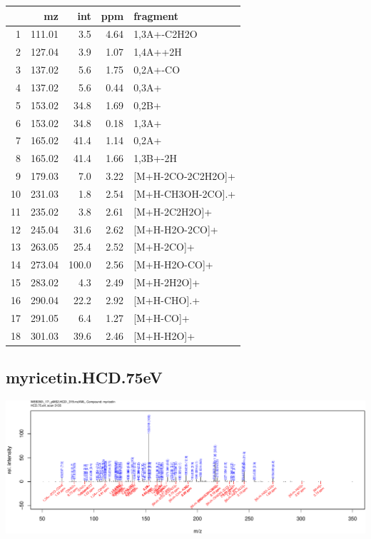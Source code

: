 \documentclass[]{article}
\begin{document}
\begin{table}[ht]
\centering
\begin{tabular}{rrrrl}
  \toprule
 & mz & int & ppm & fragment \\ 
  \midrule
1 & 111.01 & 3.5 & 4.64 & 1,3A+-C2H2O \\ 
  2 & 127.04 & 3.9 & 1.07 & 1,4A++2H \\ 
  3 & 137.02 & 5.6 & 1.75 & 0,2A+-CO \\ 
  4 & 137.02 & 5.6 & 0.44 & 0,3A+ \\ 
  5 & 153.02 & 34.8 & 1.69 & 0,2B+ \\ 
  6 & 153.02 & 34.8 & 0.18 & 1,3A+ \\ 
  7 & 165.02 & 41.4 & 1.14 & 0,2A+ \\ 
  8 & 165.02 & 41.4 & 1.66 & 1,3B+-2H \\ 
  9 & 179.03 & 7.0 & 3.22 & [M+H-2CO-2C2H2O]+ \\ 
  10 & 231.03 & 1.8 & 2.54 & [M+H-CH3OH-2CO].+ \\ 
  11 & 235.02 & 3.8 & 2.61 & [M+H-2C2H2O]+ \\ 
  12 & 245.04 & 31.6 & 2.62 & [M+H-H2O-2CO]+ \\ 
  13 & 263.05 & 25.4 & 2.52 & [M+H-2CO]+ \\ 
  14 & 273.04 & 100.0 & 2.56 & [M+H-H2O-CO]+ \\ 
  15 & 283.02 & 4.3 & 2.49 & [M+H-2H2O]+ \\ 
  16 & 290.04 & 22.2 & 2.92 & [M+H-CHO].+ \\ 
  17 & 291.05 & 6.4 & 1.27 & [M+H-CO]+ \\ 
  18 & 301.03 & 39.6 & 2.46 & [M+H-H2O]+ \\ 
   \bottomrule
\end{tabular}
\end{table}

\clearpage\subsection{myricetin.HCD.75eV}
\includegraphics[width=\textwidth]{WEB350_files/figure-latex/unnamed-chunk-3-32}
\end{document}
